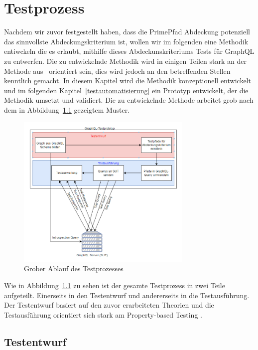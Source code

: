 \chapter{Testprozess}
\label{testentwurf}

Nachdem wir zuvor festgestellt haben, dass die PrimePfad Abdeckung potenziell das sinnvollste Abdeckungskriterium ist, wollen wir im folgenden
eine Methodik entiwckeln die es erlaubt, mithilfe dieses Abdeckunskriteriums Tests für GraphQL zu entwerfen.
Die zu entwickelnde Methodik wird in einigen Teilen stark an der Methode aus~\cite{property-based-testing} orientiert sein, dies wird
jedoch an den betreffenden Stellen kenntlich gemacht.
In diesem Kapitel wird die Methodik konzeptionell entwickelt und im folgenden Kapitel~\ref{testautomatisierung} ein Prototyp entwickelt, der
die Methodik umsetzt und validiert.
Die zu entwickelnde Methode arbeitet grob nach dem in Abbildung~\ref{methodeablauf} gezeigtem Muster.

\begin{figure}[H]
    \centering
    \includegraphics[width=0.75\textwidth,keepaspectratio]{img/fktweiseprototyp}
    \caption{Grober Ablauf des Testprozesses}
    \label{methodeablauf}
\end{figure}

Wie in Abbildung~\ref{methodeablauf} zu sehen ist der gesamte Testprozess in zwei Teile aufgeteilt.
Einerseits in den Testentwurf und andererseits in die Testausführung.
Der Testentwurf basiert auf den zuvor erarbeiteten Theorien und die Testausführung orientiert sich stark am
Property-based Testing \cite[vgl. Method]{property-based-testing}.

\section{Testentwurf}

